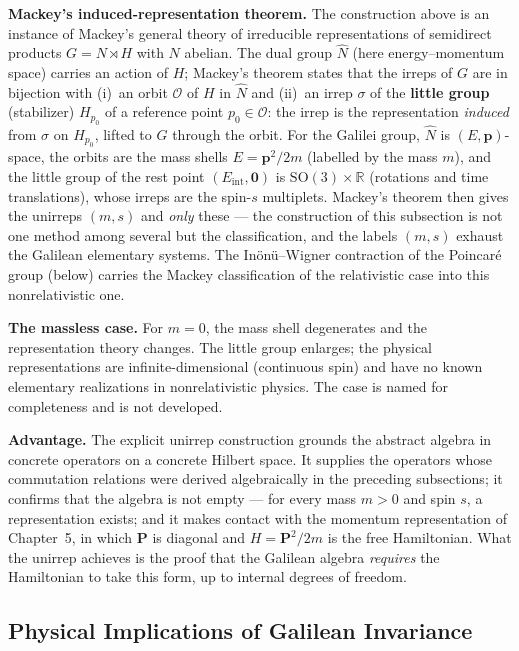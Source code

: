 \medskip\noindent\textbf{Mackey's induced-representation theorem.} The construction above is an instance of Mackey's general theory of irreducible representations of semidirect products $G=N\rtimes H$ with $N$ abelian. The dual group $\widehat N$ (here energy--momentum space) carries an action of $H$; Mackey's theorem states that the irreps of $G$ are in bijection with (i)~an orbit $\mathcal O$ of $H$ in $\widehat N$ and (ii)~an irrep $\sigma$ of the \textbf{little group} (stabilizer) $H_{p_{0}}$ of a reference point $p_{0}\in\mathcal O$: the irrep is the representation \emph{induced} from $\sigma$ on $H_{p_{0}}$, lifted to $G$ through the orbit. For the Galilei group, $\widehat N$ is $(E,\bm p)$-space, the orbits are the mass shells $E=\bm p^{2}/2m$ (labelled by the mass $m$), and the little group of the rest point $(E_{\mathrm{int}},\bm 0)$ is $\mathrm{SO}(3)\times\mathbb R$ (rotations and time translations), whose irreps are the spin-$s$ multiplets. Mackey's theorem then gives the unirreps $(m,s)$ and \emph{only} these --- the construction of this subsection is not one method among several but the classification, and the labels $(m,s)$ exhaust the Galilean elementary systems. The In\"on\"u--Wigner contraction of the Poincar\'e group (below) carries the Mackey classification of the relativistic case into this nonrelativistic one.

\medskip\noindent\textbf{The massless case.} For $m=0$, the mass shell degenerates and the representation theory changes. The little group enlarges; the physical representations are infinite-dimensional (continuous spin) and have no known elementary realizations in nonrelativistic physics. The case is named for completeness and is not developed.

\medskip\noindent\textbf{Advantage.} The explicit unirrep construction grounds the abstract algebra in concrete operators on a concrete Hilbert space. It supplies the operators whose commutation relations were derived algebraically in the preceding subsections; it confirms that the algebra is not empty --- for every mass $m>0$ and spin $s$, a representation exists; and it makes contact with the momentum representation of Chapter~5, in which $\bm P$ is diagonal and $H = \bm P^{2}/2m$ is the free Hamiltonian. What the unirrep achieves is the proof that the Galilean algebra \emph{requires} the Hamiltonian to take this form, up to internal degrees of freedom.

\subsection{Physical Implications of Galilean Invariance}
\label{sec:galilei-physical-implications}

